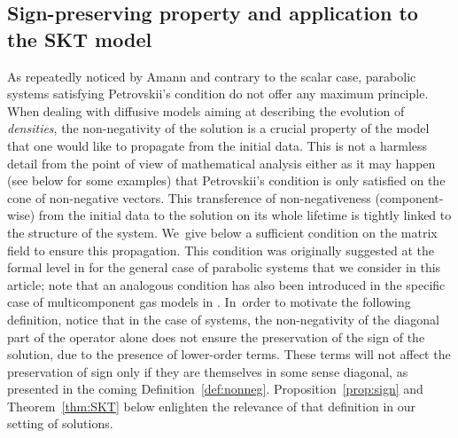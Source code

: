 \documentclass[10pt]{amsart}
\theoremstyle{definition}
\begin{document}
\subsection{Sign-preserving property and application to the SKT model}

As repeatedly noticed by Amann \cite{amann} and contrary to the scalar case, parabolic systems satisfying Petrovskii's condition do not offer any maximum principle. When dealing with diffusive models aiming at describing the evolution of \emph{densities}, the non-negativity of the solution is a crucial property of the model that one would like to propagate from the initial data. This is not a harmless detail from the point of view of mathematical analysis either as it may happen (see below for some examples) that Petrovskii's condition is only satisfied on the cone of non-negative vectors. This transference of non-negativeness (component-wise) from the initial data to the solution on its whole lifetime is tightly linked to the structure of the system. We~give below a sufficient condition on the matrix field to ensure this propagation. This condition was originally suggested at the formal level in \cite{pilou} for the general case of parabolic systems that we consider in this article; note that an analogous condition has also been introduced in the specific case of multicomponent gas models in \cite[\S 7.3.3]{gio}. In~order to motivate the following definition, notice that in the case of systems, the non-negativity of the diagonal part of the operator alone does not ensure the preservation of the sign of the solution, due to the presence of lower-order terms. These terms will not affect the preservation of sign only if they are themselves in some sense diagonal, as presented in the coming Definition~\ref{def:nonneg}. Proposition~\ref{prop:sign} and Theorem~\ref{thm:SKT} below enlighten the relevance of that definition in our setting of solutions.
\end{document}
